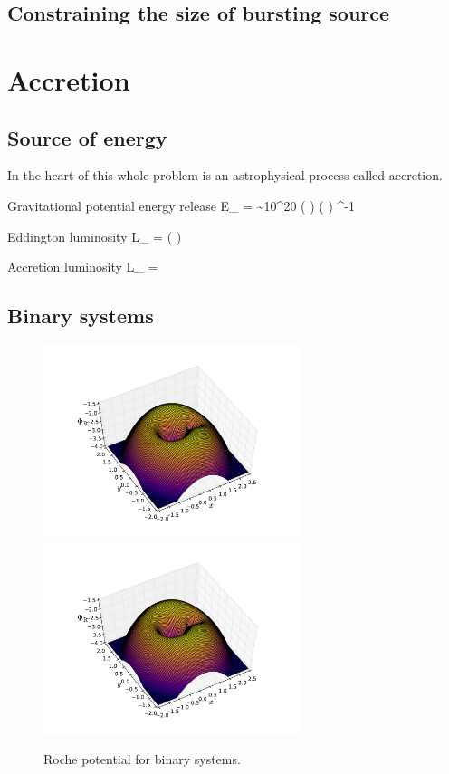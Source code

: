 \subsection{Constraining the size of bursting source}




\section{Accretion}

\subsection{Source of energy}
In the heart of this whole problem is an astrophysical process called accretion.

Gravitational potential energy release
\be
\Delta E_{} =  \sim 10^{20}  \left(  \right) \left(  \right) \unitspace\erg\unitspace\g^{-1}
\ee

Eddington luminosity
\be
L_{} =  \approx {} \left(  \right) \ergs
\ee

Accretion luminosity
\be
L_{} =  
\ee

\subsection{Binary systems}

\begin{figure}[t]
\centering
\includegraphics[width=7.5cm]{figs/astro/roche.pdf}
\includegraphics[width=7.5cm]{figs/astro/roche.pdf}
\caption{\label{fig:roche}
Roche potential for binary systems.
}
\end{figure}

